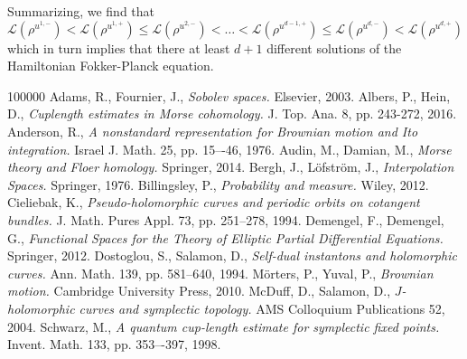\documentclass[a4paper,11pt]{amsart}
\begin{document}
\indent Summarizing, we find that \[\mathcal{L}(\rho^{u^{1,-}})<\mathcal{L}(\rho^{u^{1,+}})\leq \mathcal{L}(\rho^{u^{2,-}})<\ldots<\mathcal{L}(\rho^{u^{d-1,+}})\leq \mathcal{L}(\rho^{u^{d,-}})<\mathcal{L}(\rho^{u^{d,+}})\] which in turn implies that there at least $d+1$ different solutions of the Hamiltonian Fokker-Planck equation.\\

\begin{thebibliography}{100000}
 Adams, R., Fournier, J., \emph{Sobolev spaces.} Elsevier, 2003.
 Albers, P., Hein, D., \emph{Cuplength estimates in Morse cohomology.} J. Top. Ana. 8, pp. 243-272, 2016.
 Anderson, R., \emph{A nonstandard representation for Brownian motion and Ito
integration.} Israel J. Math. 25, pp. 15–-46, 1976.
 Audin, M., Damian, M., \emph{Morse theory and Floer homology.} Springer, 2014.
 Bergh, J., L\"ofstr\"om, J., \emph{Interpolation Spaces.} Springer, 1976.
 Billingsley, P., \emph{Probability and measure.} Wiley, 2012. 
 Cieliebak, K., \emph{Pseudo-holomorphic curves and periodic orbits on cotangent bundles.} J. Math. Pures Appl. 73, pp. 251--278, 1994.
 Demengel, F., Demengel, G., \emph{Functional Spaces for the Theory of Elliptic Partial Differential Equations.} Springer, 2012.
 Dostoglou, S., Salamon, D., \emph{Self-dual instantons and holomorphic curves.} Ann. Math. 139, pp. 581–640, 1994.
 M\"orters, P., Yuval, P., \emph{Brownian motion.} Cambridge University Press, 2010.
 McDuff, D., Salamon, D., \emph{$J$-holomorphic curves and symplectic topology.} AMS Colloquium Publications 52, 2004.
 Schwarz, M., \emph{A quantum cup-length estimate for symplectic fixed points.} Invent. Math. 133, pp. 353–-397, 1998.
\end{thebibliography}
\end{document}
